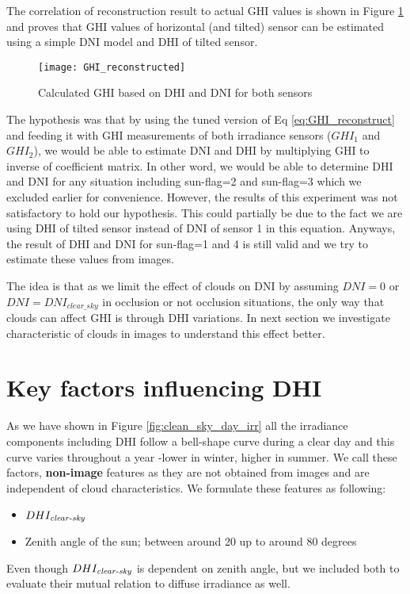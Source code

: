 The correlation of reconstruction result to actual GHI values is shown in Figure \ref{fig:GHI_reconstruct_result} and proves that GHI values of horizontal (and tilted) sensor can be estimated using a simple DNI model and DHI of tilted sensor.


\begin{figure}[h]
\caption{Calculated GHI based on DHI and DNI for both sensors}
\label{fig:GHI_reconstruct_result}
\texttt{[image: GHI\_reconstructed]}
\centering
\end{figure}

The hypothesis was that by using the tuned version of Eq \ref{eq:GHI_reconstruct} and feeding it with GHI measurements of both irradiance sensors ($GHI_1$ and $GHI_2$), we would be able to estimate DNI and DHI by multiplying GHI to inverse of coefficient matrix. In other word, we would be able to determine DHI and DNI for any situation including sun-flag=2 and sun-flag=3 which we excluded earlier for convenience. However, the results of this experiment was not satisfactory to hold our hypothesis. This could partially be due to the fact we are using DHI of tilted sensor instead of DNI of sensor 1 in this equation. Anyways, the result of DHI and DNI for sun-flag=1 and 4 is still valid and we try to estimate these values from images.

The idea is that as we limit the effect of clouds on DNI by assuming $DNI=0$ or $DNI=DNI_{clear\_sky}$ in occlusion or not occlusion situations, the only way that clouds can affect GHI is through DHI variations. In next section we investigate characteristic of clouds in images to understand this effect better.

\section{Key factors influencing DHI}
\label{sec:img-features}
As we have shown in Figure \ref{fig:clean_sky_day_irr} all the irradiance components including DHI follow a bell-shape curve during a clear day and this curve varies throughout a year -lower in winter, higher in summer. We call these factors, \textbf{non-image} features as they are not obtained from images and are independent of cloud characteristics. We formulate these features as following:
\begin{itemize}
\item $DHI_{{\operatorname{\mathit{clear-sky}}}}$
\item Zenith angle of the sun; between around 20 up to around 80 degrees
\end{itemize}
Even though $DHI_{{\operatorname{\mathit{clear-sky}}}}$ is dependent on zenith angle, but we included both to evaluate their mutual relation to diffuse irradiance as well.


